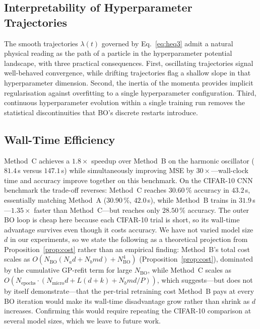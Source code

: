 \documentclass[11pt]{article}
\theoremstyle{definition}
\begin{document}
\subsection{Interpretability of Hyperparameter Trajectories}

The smooth trajectories $\lambda(t)$ governed by Eq.~\eqref{eq:heq3}
admit a natural physical reading as the path of a particle in the
hyperparameter potential landscape, with three practical
consequences. First, oscillating trajectories signal well-behaved
convergence, while drifting trajectories flag a shallow slope in that
hyperparameter dimension. Second, the inertia of the momenta
provides implicit regularisation against overfitting to a single
hyperparameter configuration. Third, continuous hyperparameter
evolution within a single training run removes the statistical
discontinuities that BO's discrete restarts introduce.

\subsection{Wall-Time Efficiency}

Method~C achieves a $1.8\times$ speedup over Method~B on the harmonic
oscillator ($81.4$\,s versus $147.1$\,s) while simultaneously
improving MSE by $30\times$---wall-clock time and accuracy improve
together on this benchmark. On the CIFAR-10 CNN benchmark the
trade-off reverses: Method~C reaches $30.60\,\%$ accuracy in
$43.2$\,s, essentially matching Method~A ($30.90\,\%$, $42.0$\,s),
while Method~B trains in $31.9$\,s---$1.35\times$ faster than
Method~C---but reaches only $28.50\,\%$ accuracy. The outer BO loop
is cheap here because each CIFAR-10 trial is short, so its wall-time
advantage survives even though it costs accuracy. We have not varied
model size $d$ in our experiments, so we state the following as a
theoretical projection from Proposition~\ref{prop:cost} rather than
an empirical finding: Method~B's total cost scales as
$O\!\left(N_{\mathrm{BO}}(N_a d + N_b md) + N_{\mathrm{BO}}^4\right)$
(Proposition~\ref{prop:cost}), dominated by the cumulative
GP-refit term for large $N_{\mathrm{BO}}$, while Method~C
scales as
$O(N_{\mathrm{epochs}}\cdot(N_{\mathrm{micro}}d+L(d+k)+N_b md/P))$,
which suggests---but does not by itself demonstrate---that the
per-trial retraining cost Method~B pays at every BO iteration would
make its wall-time disadvantage grow rather than shrink as $d$
increases. Confirming this would require repeating the CIFAR-10
comparison at several model sizes, which we leave to future work.
\end{document}

